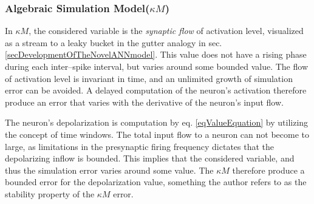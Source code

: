 		\subsubsection{Algebraic Simulation Model($\kappa M$)} %

		In $\kappa M$, the considered variable is the \emph{synaptic flow} of activation level, visualized as a stream to a leaky bucket in the gutter analogy in sec. \ref{secDevelopmentOfTheNovelANNmodel}.
		This value does not have a rising phase during each inter--spike interval, but varies around some bounded value.
		The flow of activation level is invariant in time, and an unlimited growth of simulation error can be avoided.
		A delayed computation of the neuron's activation therefore produce an error that varies with the derivative of the neuron's input flow.

		The neuron's depolarization is computation by eq. \eqref{eqValueEquation} by utilizing the concept of time windows.
		The total input flow to a neuron can not become to large, as limitations in the presynaptic firing frequency dictates that the depolarizing inflow is bounded. %
		This implies that the considered variable, and thus the simulation error varies around some value.
		The $\kappa M$ therefore produce a bounded error for the depolarization value, something the author refers to as the stability property of the $\kappa M$ error. %

